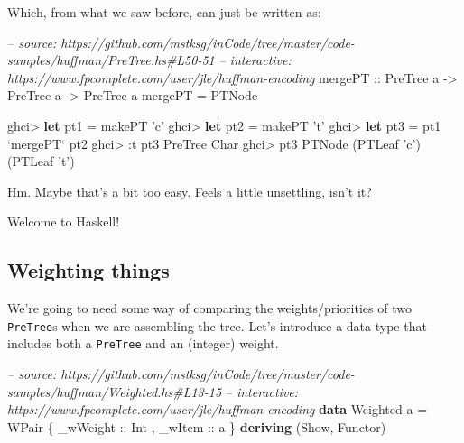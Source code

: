 \documentclass[]{article}
\newenvironment{Shaded}{}{}
\newcommand{\KeywordTok}[1]{\textcolor[rgb]{0.00,0.44,0.13}{\textbf{#1}}}
\newcommand{\DataTypeTok}[1]{\textcolor[rgb]{0.56,0.13,0.00}{#1}}
\newcommand{\CharTok}[1]{\textcolor[rgb]{0.25,0.44,0.63}{#1}}
\newcommand{\CommentTok}[1]{\textcolor[rgb]{0.38,0.63,0.69}{\textit{#1}}}
\newcommand{\OtherTok}[1]{\textcolor[rgb]{0.00,0.44,0.13}{#1}}
\newcommand{\FunctionTok}[1]{\textcolor[rgb]{0.02,0.16,0.49}{#1}}
\newcommand{\NormalTok}[1]{#1}
\begin{document}
Which, from what we saw before, can just be written as:

\begin{Shaded}
\begin{Highlighting}[]
\CommentTok{-- source: https://github.com/mstksg/inCode/tree/master/code-samples/huffman/PreTree.hs#L50-51}
\CommentTok{-- interactive: https://www.fpcomplete.com/user/jle/huffman-encoding}
\OtherTok{mergePT ::} \DataTypeTok{PreTree}\NormalTok{ a }\OtherTok{->} \DataTypeTok{PreTree}\NormalTok{ a }\OtherTok{->} \DataTypeTok{PreTree}\NormalTok{ a}
\NormalTok{mergePT }\FunctionTok{=} \DataTypeTok{PTNode}
\end{Highlighting}
\end{Shaded}

\begin{Shaded}
\begin{Highlighting}[]
\NormalTok{ghci}\FunctionTok{>} \KeywordTok{let}\NormalTok{ pt1 }\FunctionTok{=}\NormalTok{ makePT }\CharTok{'c'}
\NormalTok{ghci}\FunctionTok{>} \KeywordTok{let}\NormalTok{ pt2 }\FunctionTok{=}\NormalTok{ makePT }\CharTok{'t'}
\NormalTok{ghci}\FunctionTok{>} \KeywordTok{let}\NormalTok{ pt3 }\FunctionTok{=}\NormalTok{ pt1 }\OtherTok{`mergePT`}\NormalTok{ pt2}
\NormalTok{ghci}\FunctionTok{>} \FunctionTok{:}\NormalTok{t pt3}
\DataTypeTok{PreTree} \DataTypeTok{Char}
\NormalTok{ghci}\FunctionTok{>}\NormalTok{ pt3}
\DataTypeTok{PTNode}\NormalTok{ (}\DataTypeTok{PTLeaf} \CharTok{'c'}\NormalTok{) (}\DataTypeTok{PTLeaf} \CharTok{'t'}\NormalTok{)}
\end{Highlighting}
\end{Shaded}

Hm. Maybe that's a bit too easy. Feels a little unsettling, isn't it?

Welcome to Haskell!

\subsection{Weighting things}\label{weighting-things}

We're going to need some way of comparing the weights/priorities of two
\texttt{PreTree}s when we are assembling the tree. Let's introduce a data type
that includes both a \texttt{PreTree} and an (integer) weight.

\begin{Shaded}
\begin{Highlighting}[]
\CommentTok{-- source: https://github.com/mstksg/inCode/tree/master/code-samples/huffman/Weighted.hs#L13-15}
\CommentTok{-- interactive: https://www.fpcomplete.com/user/jle/huffman-encoding}
\KeywordTok{data} \DataTypeTok{Weighted}\NormalTok{ a }\FunctionTok{=} \DataTypeTok{WPair}\NormalTok{ \{}\OtherTok{ _wWeight ::} \DataTypeTok{Int}
\NormalTok{                        ,}\OtherTok{ _wItem   ::}\NormalTok{ a}
\NormalTok{                        \} }\KeywordTok{deriving}\NormalTok{ (}\DataTypeTok{Show}\NormalTok{, }\DataTypeTok{Functor}\NormalTok{)}
\end{Highlighting}
\end{Shaded}
\end{document}
